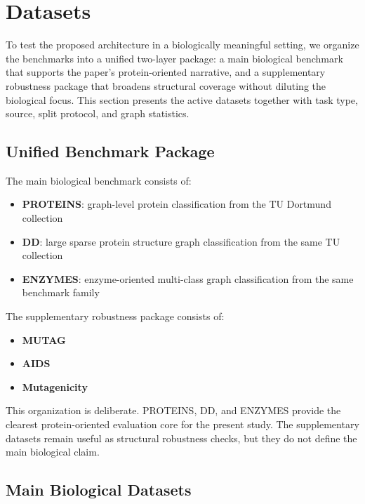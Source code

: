 \section{Datasets}
\label{sec:datasets}

To test the proposed architecture in a biologically meaningful setting, we organize the benchmarks into a unified two-layer package: a main biological benchmark that supports the paper's protein-oriented narrative, and a supplementary robustness package that broadens structural coverage without diluting the biological focus. This section presents the active datasets together with task type, source, split protocol, and graph statistics.

\subsection{Unified Benchmark Package}

The main biological benchmark consists of:

\begin{itemize}
    \item \textbf{PROTEINS}: graph-level protein classification from the TU Dortmund collection \cite{fey2019fast,morris2020tudataset}
    \item \textbf{DD}: large sparse protein structure graph classification from the same TU collection \cite{morris2020tudataset}
    \item \textbf{ENZYMES}: enzyme-oriented multi-class graph classification from the same benchmark family \cite{morris2020tudataset}
\end{itemize}

The supplementary robustness package consists of:

\begin{itemize}
    \item \textbf{MUTAG}
    \item \textbf{AIDS}
    \item \textbf{Mutagenicity}
\end{itemize}

This organization is deliberate. PROTEINS, DD, and ENZYMES provide the clearest protein-oriented evaluation core for the present study. The supplementary datasets remain useful as structural robustness checks, but they do not define the main biological claim.

\subsection{Main Biological Datasets}

